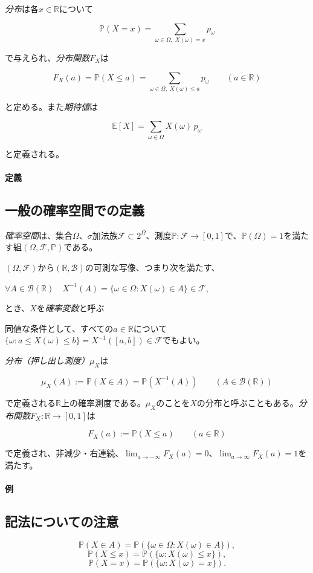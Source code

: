 \documentclass[uplatex,dvipdfmx,11pt,a4paper,openany]{bxjsbook}
\begin{document}
\emph{分布}は各$x\in\mathbb{R}$について

\[\mathbb{P}(X=x)=\sum_{\omega\in\Omega,\; X(\omega)=x} p_\omega\]

で与えられ、\emph{分布関数}$F_X$は

\[F_X(a)=\mathbb{P}(X\le a)=\sum_{\omega\in\Omega,\; X(\omega)\le a} p_\omega\qquad(a\in\mathbb{R})\]

と定める。また\emph{期待値}は

\[\mathbb{E}[X]=\sum_{\omega\in\Omega} X(\omega)\,p_\omega\]

と定義される。


\paragraph{定義}
\subsection{一般の確率空間での定義}
\emph{確率空間}は、集合$\Omega$、$\sigma$加法族$\mathcal{F}\subset 2^\Omega$、測度$\mathbb{P}:\mathcal{F}\to[0,1]$で、$\mathbb{P}(\Omega)=1$を満たす組$(\Omega,\mathcal{F},\mathbb{P})$である。

$(\Omega,\mathcal F)$から$(\mathbb R,\mathcal B)$の可測な写像、つまり次を満たす、

$\forall A\in\mathcal{B}(\mathbb{R})\quad X^{-1}(A)=\{\omega\in\Omega: X(\omega)\in A\}\in\mathcal{F},$

とき、$X$を\emph{確率変数}と呼ぶ

同値な条件として、すべての$a\in\mathbb{R}$について$\{\omega: a\le X(\omega)\le b\}=X^{-1}([a,b])\in\mathcal{F}$でもよい。

\emph{分布（押し出し測度）}$\mu_X$は

\[\mu_X(A):=\mathbb{P}(X\in A)=\mathbb{P}(X^{-1}(A))\qquad(A\in\mathcal{B}(\mathbb{R}))\]

で定義される$\mathbb{R}$上の確率測度である。$\mu_X$のことを$X$の分布と呼ぶこともある。\emph{分布関数}$F_X:\mathbb{R}\to[0,1]$は

\[F_X(a):=\mathbb{P}(X\le a)\qquad(a\in\mathbb{R})\]

で定義され、非減少・右連続、$\lim_{a\to-\infty}F_X(a)=0$、$\lim_{a\to\infty}F_X(a)=1$を満たす。


\paragraph{例}
\subsection{記法についての注意}
\[\mathbb{P}(X \in A) = \mathbb{P}(\{\omega \in \Omega : X(\omega) \in A\}),\]
\[\mathbb{P}(X \le x) = \mathbb{P}(\{\omega : X(\omega)\le x\}),\]
\[\mathbb{P}(X = x)=\mathbb{P}(\{\omega: X(\omega)=x\}).\]
\end{document}
